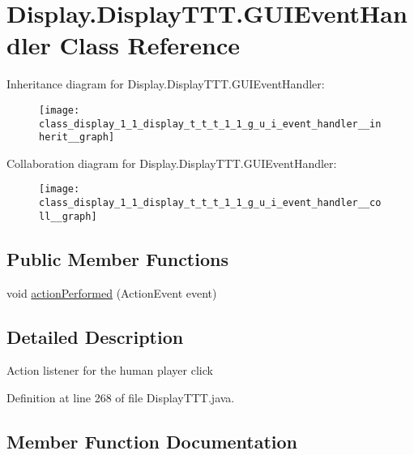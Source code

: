 \hypertarget{class_display_1_1_display_t_t_t_1_1_g_u_i_event_handler}{}\section{Display.\+Display\+T\+T\+T.\+G\+U\+I\+Event\+Handler Class Reference}
\label{class_display_1_1_display_t_t_t_1_1_g_u_i_event_handler}


Inheritance diagram for Display.\+Display\+T\+T\+T.\+G\+U\+I\+Event\+Handler\+:
\nopagebreak
\begin{figure}[H]
\begin{center}
\leavevmode
\texttt{[image: class\_display\_1\_1\_display\_t\_t\_t\_1\_1\_g\_u\_i\_event\_handler\_\_inherit\_\_graph]}
\end{center}
\end{figure}


Collaboration diagram for Display.\+Display\+T\+T\+T.\+G\+U\+I\+Event\+Handler\+:
\nopagebreak
\begin{figure}[H]
\begin{center}
\leavevmode
\texttt{[image: class\_display\_1\_1\_display\_t\_t\_t\_1\_1\_g\_u\_i\_event\_handler\_\_coll\_\_graph]}
\end{center}
\end{figure}
\subsection*{Public Member Functions}
\begin{DoxyCompactItemize}
\item 
void \hyperlink{class_display_1_1_display_t_t_t_1_1_g_u_i_event_handler_a7becbf462a2f5b6fd3159de0abdc37fe}{action\+Performed} (Action\+Event event)
\end{DoxyCompactItemize}


\subsection{Detailed Description}
Action listener for the human player click 

Definition at line 268 of file Display\+T\+T\+T.\+java.



\subsection{Member Function Documentation}
\hypertarget{class_display_1_1_display_t_t_t_1_1_g_u_i_event_handler_a7becbf462a2f5b6fd3159de0abdc37fe}{}
